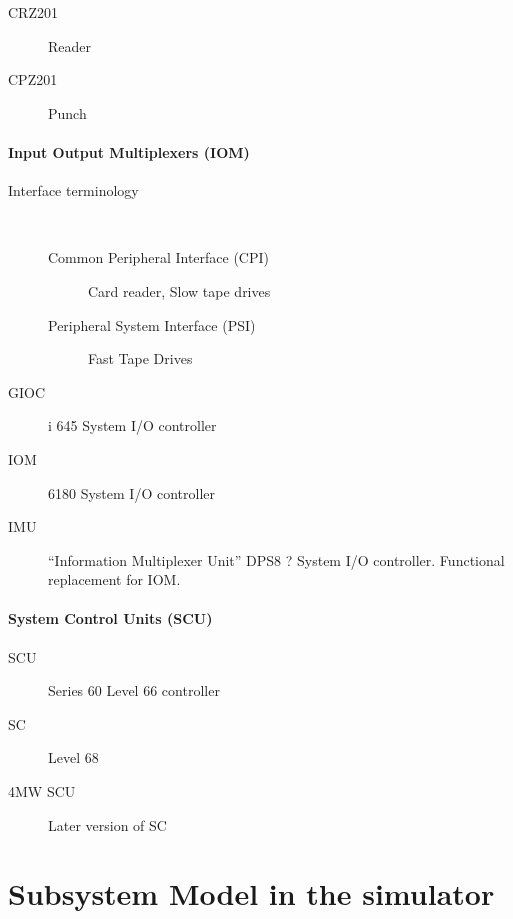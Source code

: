 \documentclass[notitlepage]{report}
\begin{document}
    \begin{description}

        \item[CRZ201] Reader
        \item[CPZ201] Punch

    \end{description}

\subsection{Input Output Multiplexers (IOM)}

    \begin{description}
        \item[Interface terminology] \hfill \\

            \begin{description}
              \item[Common Peripheral Interface (CPI)] Card reader, Slow tape drives
              \item[Peripheral System Interface (PSI)] Fast Tape Drives
            \end{description}

        \item [GIOC]i 645 System I/O controller

        \item [IOM] 6180 System I/O controller

        \item [IMU] ``Information Multiplexer Unit'' DPS8 ? System I/O 
controller. Functional replacement for IOM.

    \end{description}

\subsection {System Control Units (SCU)}

    \begin {description}
        \item [SCU] Series 60 Level 66 controller
        \item [SC] Level 68 
        \item [4MW SCU] Later version of SC
    \end {description}

\part{Subsystem Model in the simulator}
\end{document}
